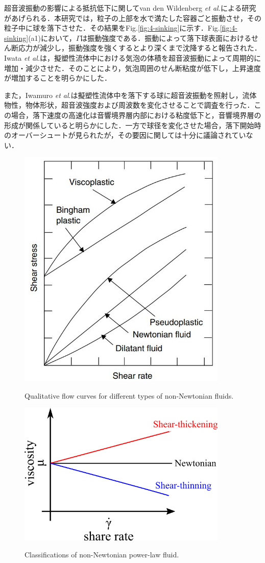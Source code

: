 超音波振動の影響による抵抗低下に関してvan den Wildenberg {\it et al.}\cite{ref:6}による研究があげられる．本研究では，粒子の上部を水で満たした容器ごと振動させ，その粒子中に球を落下させた．その結果をFig.\ref{fig:4-sinking}に示す．Fig.\ref{fig:4-sinking}(a1)において，$\Gamma$は振動強度である．振動によって落下球表面におけるせん断応力が減少し，振動強度を強くするとより深くまで沈降すると報告された．Iwata {\it et al.}\cite{ref:5}は，擬塑性流体中における気泡の体積を超音波振動によって周期的に増加・減少させた．そのことにより，気泡周囲のせん断粘度が低下し，上昇速度が増加することを明らかにした．

また，Iwamuro \textit{et al}.\cite{ref:8}は擬塑性流体中を落下する球に超音波振動を照射し，流体物性，物体形状，超音波強度および周波数を変化させることで調査を行った．この場合，落下速度の高速化は音響境界層内部における粘度低下と，音響境界層の形成が関係していると明らかにした．一方で球径を変化させた場合，落下開始時のオーバーシュートが見られたが，その要因に関しては十分に議論されていない．
\begin{figure}[ht]
    \begin{center}
        \includegraphics[width=10.0cm,clip]{1-Background/1-fluid-curve.jpg}
        \caption{Qualitative flow curves for different types of non-Newtonian fluids\cite{ref:1}.}
        \label{fig:1-fluid-curve}
        \centering
        \includegraphics[width=10.0cm,clip]{1-Background/2-Newton-fluid.png}
        \caption{Classifications of non-Newtonian power-law fluid.}
        \label{fig:2-Newton-fluid}   
    \end{center}
\end{figure}
